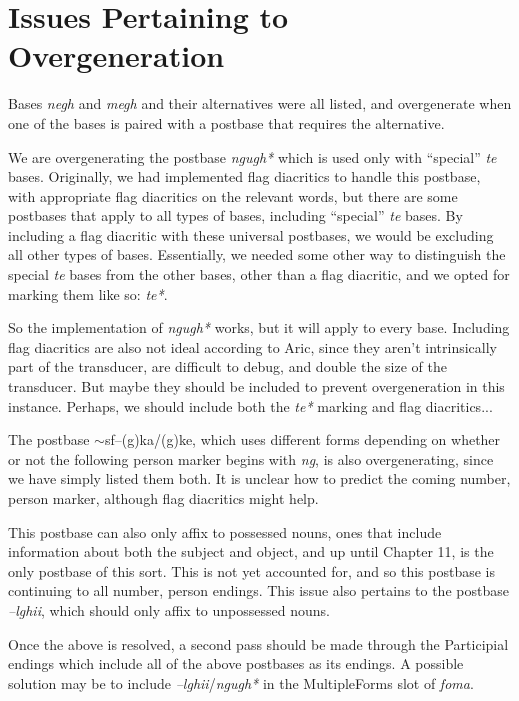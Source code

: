 \documentclass{article}
\begin{document}
\section{Issues Pertaining to Overgeneration}

\item Bases \textit{negh} and \textit{megh} and their alternatives were all listed, and overgenerate when one of the bases is paired with a postbase that requires the alternative.

\item We are overgenerating the postbase \textit{ngugh*} which is used only with ``special'' \textit{te} bases.
%
Originally, we had implemented flag diacritics to handle this postbase, with appropriate flag diacritics on the relevant words, but there are some postbases that apply to all types of bases, including ``special'' \textit{te} bases.
%
By including a flag diacritic with these universal postbases, we would be excluding all other types of bases.
%
Essentially, we needed some other way to distinguish the special \textit{te} bases from the other bases, other than a flag diacritic, and we opted for marking them like so: \textit{te*}.

So the implementation of \textit{ngugh*} works, but it will apply to every base.
%
Including flag diacritics are also not ideal according to Aric, since they aren't intrinsically part of the transducer, are difficult to debug, and double the size of the transducer.
%
But maybe they should be included to prevent overgeneration in this instance.
%
Perhaps, we should include both the \textit{te*} marking and flag diacritics...

\item The postbase $\sim$sf--(g)ka/(g)ke, which uses different forms depending on whether or not the following person marker begins with \textit{ng}, is also overgenerating, since we have simply listed them both.
%
It is unclear how to predict the coming number, person marker, although flag diacritics might help.

This postbase can also only affix to possessed nouns, ones that include information about both the subject and object, and up until Chapter 11, is the only postbase of this sort.
%
This is not yet accounted for, and so this postbase is continuing to all number, person endings.
%
This issue also pertains to the postbase \textit{--lghii}, which should only affix to unpossessed nouns.

\item Once the above is resolved, a second pass should be made through the Participial endings which include all of the above postbases as its endings.
%
A possible solution may be to include \textit{--lghii}/\textit{ngugh*} in the MultipleForms slot of \textit{foma}.
\end{document}
